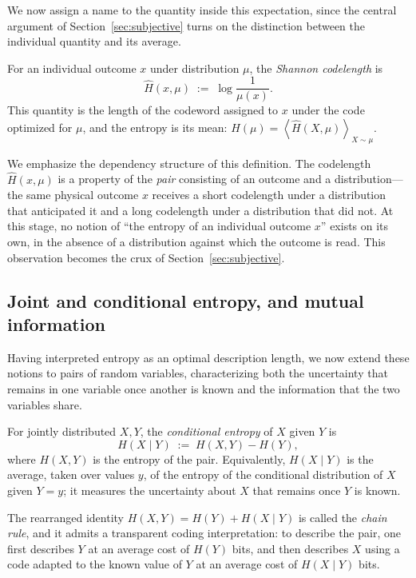 \documentclass[11pt]{article}
\newcommand{\E}[1]{\left\langle #1 \right\rangle}
\begin{document}
We now assign a name to the quantity inside this expectation, since the central argument of Section~\ref{sec:subjective} turns on the distinction between the individual quantity and its average.

\begin{definition}
\label{def:codelength}
For an individual outcome $x$ under distribution $\mu$, the \emph{Shannon codelength} is
\[
\hat H(x, \mu) \;:=\; \log \frac{1}{\mu(x)} .
\]
This quantity is the length of the codeword assigned to $x$ under the code optimized for $\mu$, and the entropy is its mean: $H(\mu) = \E{\hat H(X,\mu)}_{X \sim \mu}$.
\end{definition}

We emphasize the dependency structure of this definition. The codelength $\hat H(x, \mu)$ is a property of the \emph{pair} consisting of an outcome and a distribution---the same physical outcome $x$ receives a short codelength under a distribution that anticipated it and a long codelength under a distribution that did not. At this stage, no notion of ``the entropy of an individual outcome $x$'' exists on its own, in the absence of a distribution against which the outcome is read. This observation becomes the crux of Section~\ref{sec:subjective}.

\subsection{Joint and conditional entropy, and mutual information}

Having interpreted entropy as an optimal description length, we now extend these notions to pairs of random variables, characterizing both the uncertainty that remains in one variable once another is known and the information that the two variables share.

\begin{definition}
For jointly distributed $X, Y$, the \emph{conditional entropy} of $X$ given $Y$ is
\[
H(X \mid Y) \;:=\; H(X, Y) - H(Y),
\]
where $H(X,Y)$ is the entropy of the pair. Equivalently, $H(X \mid Y)$ is the average, taken over values $y$, of the entropy of the conditional distribution of $X$ given $Y = y$; it measures the uncertainty about $X$ that remains once $Y$ is known.
\end{definition}

The rearranged identity $H(X,Y) = H(Y) + H(X \mid Y)$ is called the \emph{chain rule}, and it admits a transparent coding interpretation: to describe the pair, one first describes $Y$ at an average cost of $H(Y)$ bits, and then describes $X$ using a code adapted to the known value of $Y$ at an average cost of $H(X \mid Y)$ bits.
\end{document}
